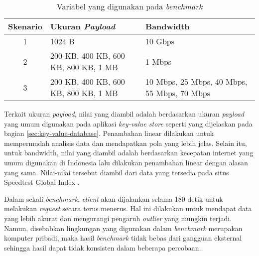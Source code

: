 \begin{table}[ht]
  \centering
  \caption{Variabel yang digunakan pada \textit{benchmark}}
  \label{tab:variabel-benchmark}
  \begin{tabular}{|c|p{5.5cm}|p{5.5cm}|}
    \hline
    \textbf{Skenario} & \textbf{Ukuran \textit{Payload}} & \textbf{Bandwidth} \\ \hline
    1 & 1024 B & 10 Gbps \\ \hline
    2 & 200 KB, 400 KB, 600 KB, 800 KB, 1 MB & 1 Mbps \\ \hline
    3 & 200 KB, 400 KB, 600 KB, 800 KB, 1 MB & 10 Mbps, 25 Mbps, 40 Mbps, 55 Mbps, 70 Mbps \\ \hline
  \end{tabular}
\end{table}

Terkait ukuran \textit{payload}, nilai yang diambil adalah berdasarkan ukuran \textit{payload} yang umum digunakan pada aplikasi \textit{key-value store} seperti yang dijelaskan pada bagian \ref{sec:key-value-database}. Penambahan linear dilakukan untuk mempermudah analisis data dan mendapatkan pola yang lebih jelas. Selain itu, untuk bandwidth, nilai yang diambil adalah berdasarkan kecepatan internet yang umum digunakan di Indonesia lalu dilakukan penambahan linear dengan alasan yang sama. Nilai-nilai tersebut diambil dari data yang tersedia pada situs Speedtest Global Index \cite{ookla2025speedtest}.

Dalam sekali \textit{benchmark}, \textit{client} akan dijalankan selama 180 detik untuk melakukan \textit{request} secara terus menerus. Hal ini dilakukan untuk mendapat data yang lebih akurat dan mengurangi pengaruh \textit{outlier} yang mungkin terjadi. Namun, disebabkan lingkungan yang digunakan dalam \textit{benchmark} merupakan komputer pribadi, maka hasil \textit{benchmark} tidak bebas dari gangguan eksternal sehingga hasil dapat tidak konsisten dalam beberapa percobaan.